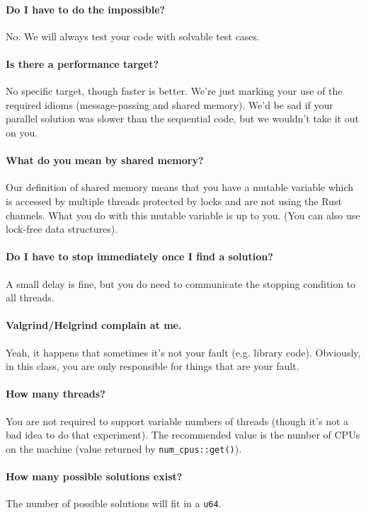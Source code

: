 \documentclass[12pt]{article}
\renewcommand{\_}{\kern-1.5pt\textunderscore\kern-1.5pt}
\begin{document}
\paragraph{Do I have to do the impossible?} No. We will always test your code with solvable test cases.

\paragraph{Is there a performance target?} No specific target, though faster is better. We're just marking your use of the required idioms (message-passing and shared memory). We'd be sad if your parallel solution was slower than the sequential code, but we wouldn't take it out on you.

\paragraph{What do you mean by shared memory?} Our definition of shared memory means that you have a mutable variable which is accessed by multiple threads protected by locks and are not using the Rust channels. What you do with this mutable variable is up to you. (You can also use lock-free data structures).

\paragraph{Do I have to stop immediately once I find a solution?} A small delay is fine, but you do need to communicate the stopping condition to all threads.

\paragraph{Valgrind/Helgrind complain at me.} Yeah, it happens that sometimes it's not your fault (e.g. library code). Obviously, in this class, you are only responsible for things that are your fault.

\paragraph{How many threads?} You are not required to support variable numbers of threads (though it's not a bad idea to do that experiment). The recommended value is the number of CPUs on the machine (value returned by \verb+num_cpus::get()+).

\paragraph{How many possible solutions exist?} The number of possible solutions will fit in a \texttt{u64}.
\end{document}
